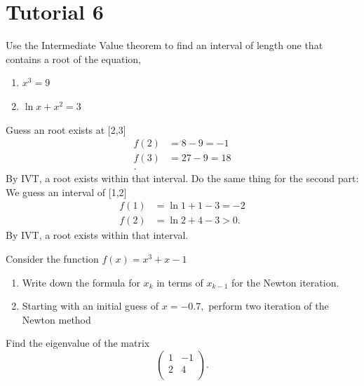 \documentclass[5pt, a4paper]{article}
\begin{document}
\section*{Tutorial 6}
\begin{tcolorbox}[title=Question 1]
    Use the Intermediate Value theorem to find an interval of length one that
    contains a root of the equation, 
    \begin{enumerate}[label=(\alph*)]
        \item $x^3 = 9$
        \item $\ln x + x^2 = 3$
    \end{enumerate}
\end{tcolorbox} 
Guess an root exists at [2,3]
\begin{align*}
    f(2) &= 8 - 9 = -1 \\
    f(3) &= 27 - 9 = 18 \\
.\end{align*}
By IVT, a root exists within that interval.
Do the same thing for the second part: We guess an interval of [1,2]
\begin{align*}
    f(1) &= \ln 1 + 1 - 3  =-2 \\
    f(2) &=  \ln 2 + 4 - 3 > 0 
.\end{align*}
By IVT, a root exists within that interval.
\begin{tcolorbox}[title=Question 2]
    Consider the function $f(x) = x^3 + x - 1$
    \begin{enumerate}
        \item Write down the formula for $x_k$ in terms of  $x_{k-1}$ for the
            Newton iteration.
        \item Starting with an initial guess of $x = -0.7,$ perform two
            iteration of the Newton method
    \end{enumerate}
\end{tcolorbox} 

\begin{tcolorbox}[title=Question 3]
    Find the eigenvalue of the matrix \[
    \begin{pmatrix}  
        1 & -1 \\ 
        2 & 4 \\
    \end{pmatrix} 
    .\] 
\end{tcolorbox} 
\end{document}
